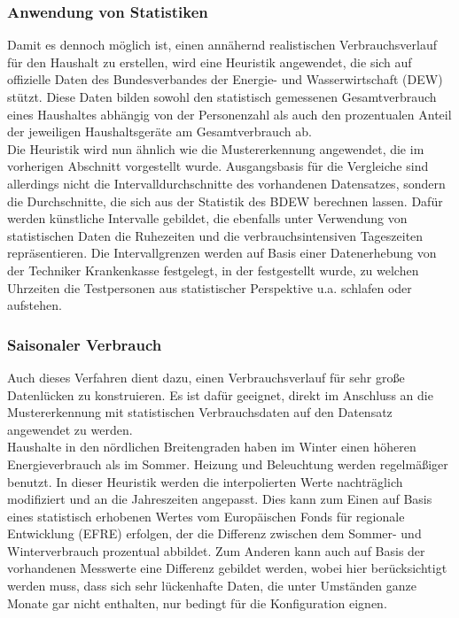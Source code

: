 \subsubsection{Anwendung von Statistiken}
Damit es dennoch möglich ist, einen annähernd realistischen Verbrauchsverlauf für den Haushalt zu erstellen, wird eine Heuristik angewendet, die sich auf offizielle Daten des Bundesverbandes der Energie- und Wasserwirtschaft (DEW) stützt. Diese Daten bilden sowohl den statistisch gemessenen Gesamtverbrauch eines Haushaltes abhängig von der Personenzahl als auch den prozentualen Anteil der jeweiligen Haushaltsgeräte am Gesamtverbrauch ab.\\
Die Heuristik wird nun ähnlich wie die Mustererkennung angewendet, die im vorherigen Abschnitt vorgestellt wurde. Ausgangsbasis für die Vergleiche sind allerdings nicht die Intervalldurchschnitte des vorhandenen Datensatzes, sondern die Durchschnitte, die sich aus der Statistik des BDEW berechnen lassen. Dafür werden künstliche Intervalle gebildet, die ebenfalls unter Verwendung von statistischen Daten die Ruhezeiten und die verbrauchsintensiven Tageszeiten repräsentieren. Die Intervallgrenzen werden auf Basis einer Datenerhebung von der Techniker Krankenkasse festgelegt, in der festgestellt wurde, zu welchen Uhrzeiten die Testpersonen aus statistischer Perspektive u.a. schlafen oder aufstehen.

\subsubsection{Saisonaler Verbrauch}
Auch dieses Verfahren dient dazu, einen Verbrauchsverlauf für sehr große Datenlücken zu konstruieren. Es ist dafür geeignet, direkt im Anschluss an die Mustererkennung mit statistischen Verbrauchsdaten auf den Datensatz angewendet zu werden.\\
Haushalte in den nördlichen Breitengraden haben im Winter einen höheren Energieverbrauch als im Sommer. Heizung und Beleuchtung werden regelmäßiger benutzt. In dieser Heuristik werden die interpolierten Werte nachträglich modifiziert und an die Jahreszeiten angepasst. Dies kann zum Einen auf Basis eines statistisch erhobenen Wertes vom Europäischen Fonds für regionale Entwicklung (EFRE) erfolgen, der die Differenz zwischen dem Sommer- und Winterverbrauch prozentual abbildet. Zum Anderen kann auch auf Basis der vorhandenen Messwerte eine Differenz gebildet werden, wobei hier berücksichtigt werden muss, dass sich sehr lückenhafte Daten, die unter Umständen ganze Monate gar nicht enthalten, nur bedingt für die Konfiguration eignen. 
